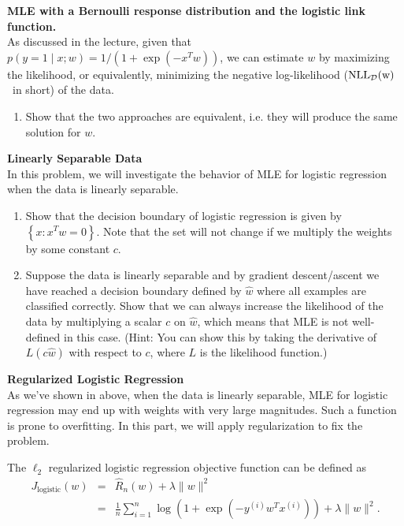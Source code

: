\documentclass{article}
\newcommand{\nyuparagraph}[1]{\vspace{0.3cm}\textcolor{nyupurple}{\bf \large #1}\\}
\newcommand{\nll}{\rm NLL}
\theoremstyle{plain}
\theoremstyle{definition}
\begin{document}
\textbf{MLE with a Bernoulli response distribution and the logistic link function.}\\
As discussed in the lecture, given that
$p(y=1 \mid x; w) = 1 / (1 + \exp(-x^Tw))$,
we can estimate $w$ by maximizing the likelihood, or equivalently,
minimizing the negative log-likelihood ($\nll_{\mathcal{D}}(w)$~in short) of the data.

\begin{enumerate}
  \setcounter{enumi}{\value{saveenum}}
  \item Show that the two approaches are equivalent, i.e. they will produce the same solution for $w$.
\setcounter{saveenum}{\value{enumi}}
\end{enumerate}
\nyuparagraph{Linearly Separable Data}
\label{sec:linear}
In this problem, we will investigate the behavior of MLE for logistic regression when the data is linearly separable.

\begin{enumerate}
  \setcounter{enumi}{\value{saveenum}}
\item Show that the decision boundary of logistic regression is given by $\left\{x\colon x^Tw=0\right\}$.
Note that the set will not change if we multiply the weights by some constant $c$.
\item Suppose the data is linearly separable and by gradient descent/ascent we have reached a decision boundary defined by $\hat{w}$ where all examples are classified correctly. 
Show that we can always increase the likelihood of the data by multiplying a scalar $c$ on $\hat{w}$,
which means that MLE is not well-defined in this case.
{(Hint: You can show this by taking the derivative of $L(c\hat{w})$ with respect to $c$, where $L$ is the likelihood function.)}

\setcounter{saveenum}{\value{enumi}}
\end{enumerate}

\nyuparagraph{\label{subsec:Regularized-Logistic-Regression}Regularized Logistic
Regression}
As we've shown in above, when the data is linearly separable,
MLE for logistic regression may end up with weights with very large magnitudes. Such a function is prone to overfitting.
In this part, we will apply regularization to fix the problem.

The $\ell_2$ regularized
logistic regression objective function can be defined as
\begin{eqnarray*}
J_{\text{logistic}}(w) & = & \hat{R}_{n}(w)+\lambda\|w\|^{2}\\
 & = & \frac{1}{n}\sum_{i=1}^{n}\log\left(1+\exp\left(-y^{(i)}w^{T}x^{(i)}\right)\right)+\lambda\|w\|^{2}.
\end{eqnarray*}
 
\end{document}
